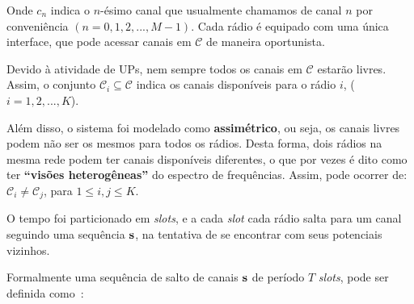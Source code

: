 Onde $c_{n}$ indica o $n$-ésimo canal que usualmente chamamos de canal $n$ por conveniência $(n = 0,1,2,...,M-1)$. Cada rádio é equipado com uma única interface, que pode acessar canais em $\mathcal{C}$ de maneira oportunista.

Devido à atividade de UPs, nem sempre todos os canais em $\mathcal{C}$ estarão livres. Assim, o conjunto ${\mathcal{C}}_i \subseteq \mathcal{C}$ indica os canais disponíveis para o rádio $i$, ($i=1,2,...,K$).

Além disso, o sistema foi modelado como {\bf assimétrico}, ou seja, os canais livres podem não ser os mesmos para todos os rádios. Desta forma, dois rádios na mesma rede podem ter canais disponíveis diferentes, o que por vezes é dito como ter {\bf ``visões heterogêneas''} do espectro de frequências. Assim, pode ocorrer de: ${\mathcal{C}}_i \neq {\mathcal{C}}_j$, para $1 \leq i,j \leq K$. 





O tempo foi particionado em {\it slots}, e a cada {\it slot} cada rádio salta para um canal seguindo uma sequência ${\bf s}$, na tentativa de se encontrar com seus potenciais vizinhos. 





Formalmente uma sequência de salto de canais ${\bf s}$ de período $T$ {\it slots}, pode ser definida como~\cite{ach}:  

